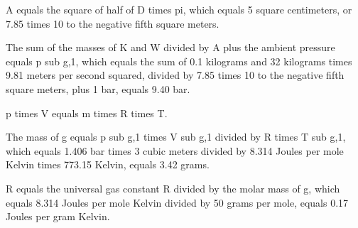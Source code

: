 A equals the square of half of D times pi, which equals 5 square centimeters, or 7.85 times 10 to the negative fifth square meters.

The sum of the masses of K and W divided by A plus the ambient pressure equals p sub g,1, which equals the sum of 0.1 kilograms and 32 kilograms times 9.81 meters per second squared, divided by 7.85 times 10 to the negative fifth square meters, plus 1 bar, equals 9.40 bar.

p times V equals m times R times T.

The mass of g equals p sub g,1 times V sub g,1 divided by R times T sub g,1, which equals 1.406 bar times 3 cubic meters divided by 8.314 Joules per mole Kelvin times 773.15 Kelvin, equals 3.42 grams.

R equals the universal gas constant R divided by the molar mass of g, which equals 8.314 Joules per mole Kelvin divided by 50 grams per mole, equals 0.17 Joules per gram Kelvin.